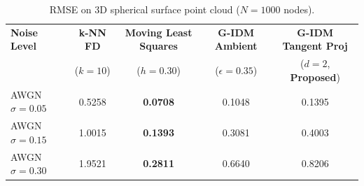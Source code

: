 \documentclass[11pt,a4paper]{article}
\theoremstyle{definition}
\begin{document}
\begin{table}[htbp]
\centering
\footnotesize
\setlength{\tabcolsep}{4pt}
\caption{RMSE on 3D spherical surface point cloud ($N = 1000$ nodes).}
\label{tab:sphere_results}
\begin{tabular*}{\textwidth}{@{\extracolsep{\fill}}lcccc@{}}
\toprule
\textbf{Noise Level} & \textbf{k-NN FD} & \textbf{Moving Least Squares} & \textbf{G-IDM Ambient} & \textbf{G-IDM Tangent Proj} \\
& ($k=10$) & ($h=0.30$) & ($\epsilon=0.35$) & ($d=2$, \textbf{Proposed}) \\
\midrule
AWGN $\sigma = 0.05$ & 0.5258 & \textbf{0.0708} & 0.1048 & 0.1395 \\
AWGN $\sigma = 0.15$ & 1.0015 & \textbf{0.1393} & 0.3081 & 0.4003 \\
AWGN $\sigma = 0.30$ & 1.9521 & \textbf{0.2811} & 0.6640 & 0.8206 \\
\bottomrule
\end{tabular*}
\end{table}
\end{document}
